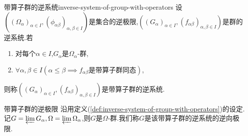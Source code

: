 \begin{definition}{带算子群的逆系统}{inverse-system-of-group-with-operators}
	设$\left(\left(\Omega_{\alpha}\right)_{\alpha\in I},\left(\phi_{\alpha\beta}\right)_{\alpha,\beta\in I}\right)$是集合的逆极限,$\left(\left(G_{\alpha}\right)_{\alpha\in I},\left(f_{\alpha\beta}\right)_{\alpha,\beta\in I}\right)$是群的逆系统.若
	\begin{enumerate}
		\item 对每个$\alpha\in I$,$G_{\alpha}$是$\Omega_{\alpha}$-群,
		\item $\forall\alpha,\beta\in I\left(\alpha\leq\beta\implies f_{\alpha\beta}\text{是带算子群同态}\right)$,
	\end{enumerate}
	则称$\left(\left(G_{\alpha}\right)_{\alpha\in I},\left(f_{\alpha\beta}\right)_{\alpha,\beta\in I}\right)$是带算子群的逆系统.
\end{definition}

\begin{definition}{带算子群的逆极限}{}
	沿用定义(\ref{def:inverse-system-of-group-with-operators})的设定.记$G=\varprojlim G_{\alpha},\Omega=\varprojlim \Omega_{\alpha}$,则$G$是$\Omega$-群.我们称$G$是该带算子群的逆系统的逆向极限.
\end{definition}












